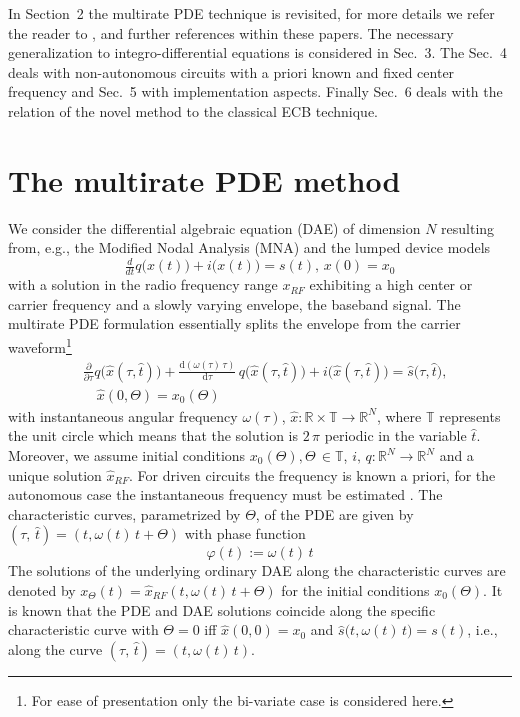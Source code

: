\documentclass[journal]{IEEEtran}
\newcommand{\beq}{\begin{equation}}
\newcommand{\eeq}{ \end{equation} }
\newcommand{\no}{\nonumber}
\newcommand{\dbyd}[2]{\ensuremath{\tfrac{\mathrm{d} {#1}}{\mathrm{d}%
{#2}}}}
\newcommand{\R}{\ensuremath{\mathbb{R}}}
\newcommand{\htt}{\ensuremath{\hat{t}}}
\begin{document}
In Section~2 the multirate PDE technique is revisited, for more details we refer
the reader to \cite{BWL+96,BiBra14a,Roy01,NL96,PG02}, and further references within these papers. 
The 
necessary generalization to integro-differential equations is considered in Sec.~3. The Sec.~4
deals with non-autonomous circuits with a priori known and fixed center frequency and Sec.~5
with implementation aspects. Finally Sec.~6 deals with the relation of the novel
method to the classical ECB technique.


\section{The multirate PDE method}

We consider the differential algebraic equation (DAE) of dimension $N$
resulting from, e.g., the Modified Nodal Analysis (MNA) and the lumped device
models
\beq
\tfrac{d}{dt}q\big(x(t)\big)
        + i\big(x(t)\big) = s(t),\, x(0) = x_0 \label{eq.1}
\eeq
with a solution in the radio frequency range $x_{RF}$ exhibiting a 
high center or carrier
frequency and a slowly varying envelope, the baseband signal.
The multirate PDE formulation \cite{BWL+96,Roy01,NL96,PG02} 
essentially splits the envelope from the
carrier waveform\footnote{For ease of presentation only the bi-variate 
case is considered here.}
\begin{align}
&\tfrac{\partial}{\partial \tau} q\big(\hat{x}(\tau,\htt)\big)
+ \dbyd{(\omega(\tau)\,\tau)}{\tau}\,
  q\big(\hat{x}(\tau,\htt)\big)
+i\big(\hat{x}(\tau,\htt)\big)=\hat{s}\big(\tau,\htt\big), \no\\
&\quad \hat{x}(0,\Theta) = x_0(\Theta) \label{eq.2}
\end{align}
with instantaneous angular frequency $\omega(\tau)$, $\hat{x}: \R \times \mathbb{T}
\rightarrow \R^N$, where $\mathbb{T}$ represents the unit circle which means that the
solution is $2\,\pi$ periodic in the variable $\htt$. Moreover, we assume
 initial conditions $x_0(\Theta), \Theta \, \in \mathbb{T}$, $i,\,q: \R^N
\rightarrow \R^N$ and a unique
 solution $\hat{x}_{RF}$. 
 For driven circuits the frequency is known a priori, for the autonomous
 case the instantaneous frequency must be estimated \cite{BBL12a}.
 The characteristic curves, parametrized by $\Theta$, of the PDE are given by
 $(\tau,\,\htt) = (t,\omega(t)\,t + \Theta)$ with phase function
 \beq
  \varphi(t) := \omega(t)\,t \label{eq.2a}
 \eeq 
The solutions of the
 underlying ordinary DAE along the characteristic curves are denoted by 
 $x_\Theta(t) = \hat{x}_{RF}(t,\omega(t)\,t + \Theta)$
 for the initial conditions $x_0(\Theta)$.
  It is known that the PDE and DAE solutions coincide
along the specific characteristic curve with $\Theta=0$
iff $\hat{x}(0,0) = x_0$ and $\hat{s}\big(t,\omega(t)\,t\big) = s(t)$,
i.e., along the curve $(\tau,\,\htt) = (t,\omega(t)\,t)$.
\end{document}
